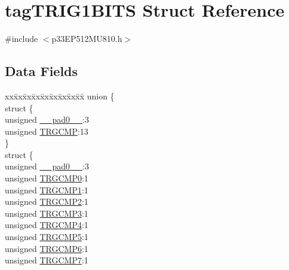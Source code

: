 \hypertarget{structtag_t_r_i_g1_b_i_t_s}{}\section{tag\+T\+R\+I\+G1\+B\+I\+TS Struct Reference}
\label{structtag_t_r_i_g1_b_i_t_s}


{\ttfamily \#include $<$p33\+E\+P512\+M\+U810.\+h$>$}

\subsection*{Data Fields}
\begin{DoxyCompactItemize}
\item 
\begin{tabbing}
xx\=xx\=xx\=xx\=xx\=xx\=xx\=xx\=xx\=\kill
union \{\\
\>struct \{\\
\>\>unsigned \hyperlink{structtag_t_r_i_g1_b_i_t_s_adf71f3d8410c1f1dbbc96680a92c49af}{\_\_pad0\_\_}:3\\
\>\>unsigned \hyperlink{structtag_t_r_i_g1_b_i_t_s_aceafdcd310f8a6833f64c9d20ec5567e}{TRGCMP}:13\\
\>\} \\
\>struct \{\\
\>\>unsigned \hyperlink{structtag_t_r_i_g1_b_i_t_s_adf71f3d8410c1f1dbbc96680a92c49af}{\_\_pad0\_\_}:3\\
\>\>unsigned \hyperlink{structtag_t_r_i_g1_b_i_t_s_a592102a5d0362674b8b287b5f8dd9f2a}{TRGCMP0}:1\\
\>\>unsigned \hyperlink{structtag_t_r_i_g1_b_i_t_s_ab2a016c04074d53199dbd32df07c6d09}{TRGCMP1}:1\\
\>\>unsigned \hyperlink{structtag_t_r_i_g1_b_i_t_s_a1fd283d3a2f1005e0d597b4e61399485}{TRGCMP2}:1\\
\>\>unsigned \hyperlink{structtag_t_r_i_g1_b_i_t_s_a823f89a0ad77efa6c3c8d01c3932f03e}{TRGCMP3}:1\\
\>\>unsigned \hyperlink{structtag_t_r_i_g1_b_i_t_s_a2bf01f968c2bba2453f76d1590c70490}{TRGCMP4}:1\\
\>\>unsigned \hyperlink{structtag_t_r_i_g1_b_i_t_s_a6dc78e81c5a3e6993b4558dff9657ee2}{TRGCMP5}:1\\
\>\>unsigned \hyperlink{structtag_t_r_i_g1_b_i_t_s_a9ba81e821299317a829e795392b93beb}{TRGCMP6}:1\\
\>\>unsigned \hyperlink{structtag_t_r_i_g1_b_i_t_s_aa801131b5ab0b542a360d202275ea4fd}{TRGCMP7}:1\\

\end{tabbing}
\end{DoxyCompactItemize}

